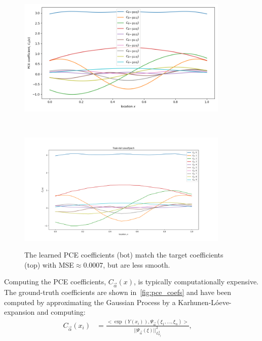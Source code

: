 \documentclass[letterpaper, 10 pt, conference, twocolumn]{ieeeconf}  %
\begin{document}
\begin{figure}[t]
    \centering
    \begin{minipage}[b]{0.8\linewidth}
    \centering\includegraphics [trim=0 0 0 0, clip, width=0.9\textwidth, angle = 0]{figures/pce_poly_deg_3/pce_coefs}
    \label{fig:pce_coefs}
    \end{minipage}%
    \\
    \begin{minipage}[b]{0.9\linewidth}
    \centering\includegraphics [trim=0 0 0 0, clip, width=0.9\textwidth, angle = 0]{figures/est_pce_coefs_nn/nn_pce_coefs}
    \label{fig:nn_pce_coefs}
    \end{minipage}%
\caption{The learned PCE coefficients (bot) match the target coefficients (top) with MSE$\approx 0.0007$, but are less smooth.}
\label{fig:all_pce_coefs}
\end{figure}
Computing the PCE coefficients, $C_{\vec\alpha}(x)$, is typically computationally expensive. The ground-truth coefficients are shown in~\cref{fig:pce_coefs} and have been computed by approximating the Gaussian Process by a Karhunen-Lóeve-expansion and computing:
\begin{equation}
\begin{aligned}
  C_{\vec \alpha}(x_i) &= \frac{<\exp(Y(x_i)), \Psi_{\vec\alpha}(\xi_1, ..., \xi_n)>}{\lvert\lvert\Psi_{\vec\alpha}(\xi)\rvert\rvert_{L^2_{\mu_\xi}}^2}, \;\;\;\; \\
\end{aligned}
\label{eq:pce_coef}
\end{equation}
\end{document}
